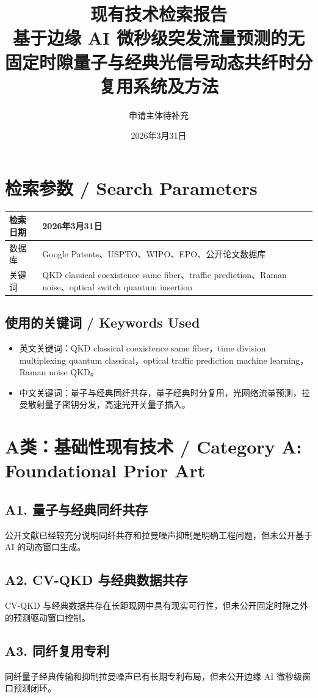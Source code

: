 ﻿\documentclass[12pt,a4paper]{article}
\title{\textbf{现有技术检索报告}\\[0.5em]\Large 基于边缘 AI 微秒级突发流量预测的无固定时隙量子与经典光信号动态共纤时分复用系统及方法}
\author{申请主体待补充}
\date{2026年3月31日}
\begin{document}
\maketitle
\tableofcontents
\newpage
\section{检索参数 / Search Parameters}
\begin{tabular}{|p{4cm}|p{9cm}|}
\hline
检索日期 & 2026年3月31日 \\
\hline
数据库 & Google Patents、USPTO、WIPO、EPO、公开论文数据库 \\
\hline
关键词 & QKD classical coexistence same fiber、traffic prediction、Raman noise、optical switch quantum insertion \\
\hline
\end{tabular}

\subsection{使用的关键词 / Keywords Used}
\begin{itemize}
\item 英文关键词：QKD classical coexistence same fiber，time division multiplexing quantum classical，optical traffic prediction machine learning，Raman noise QKD。
\item 中文关键词：量子与经典同纤共存，量子经典时分复用，光网络流量预测，拉曼散射量子密钥分发，高速光开关量子插入。
\end{itemize}

\section{A类：基础性现有技术 / Category A: Foundational Prior Art}
\subsection{A1. 量子与经典同纤共存}
公开文献已经较充分说明同纤共存和拉曼噪声抑制是明确工程问题，但未公开基于 AI 的动态窗口生成。

\subsection{A2. CV-QKD 与经典数据共存}
CV-QKD 与经典数据共存在长距现网中具有现实可行性，但未公开固定时隙之外的预测驱动窗口控制。

\subsection{A3. 同纤复用专利}
同纤量子经典传输和抑制拉曼噪声已有长期专利布局，但未公开边缘 AI 微秒级窗口预测闭环。
\end{document}

